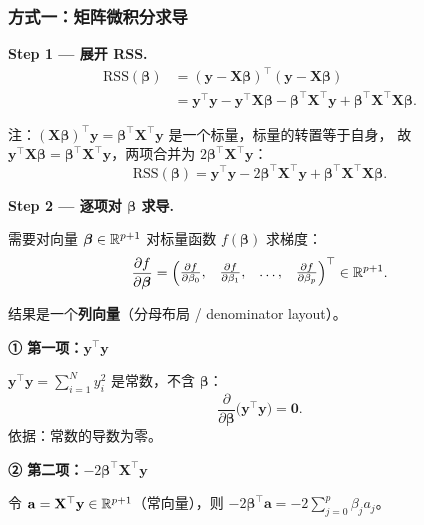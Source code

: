 \subsubsection{方式一：矩阵微积分求导}

\textbf{Step 1 --- 展开 RSS.}
\begin{align}
    \mathrm{RSS}(\bm{\beta})
    &= (\mathbf{y} - \mathbf{X}\bm{\beta})^\top (\mathbf{y} - \mathbf{X}\bm{\beta}) \nonumber\\
    &= \mathbf{y}^\top \mathbf{y} - \mathbf{y}^\top \mathbf{X}\bm{\beta}
       - \bm{\beta}^\top \mathbf{X}^\top \mathbf{y}
       + \bm{\beta}^\top \mathbf{X}^\top \mathbf{X} \bm{\beta}. \label{eq:rss_expanded}
\end{align}

注：$(\mathbf{X}\bm{\beta})^\top \mathbf{y} = \bm{\beta}^\top \mathbf{X}^\top \mathbf{y}$ 是一个标量，标量的转置等于自身，
故 $\mathbf{y}^\top \mathbf{X}\bm{\beta} = \bm{\beta}^\top \mathbf{X}^\top \mathbf{y}$，两项合并为 $2\bm{\beta}^\top \mathbf{X}^\top \mathbf{y}$：
\begin{equation}
    \mathrm{RSS}(\bm{\beta})
    = \mathbf{y}^\top \mathbf{y} - 2\bm{\beta}^\top \mathbf{X}^\top \mathbf{y}
      + \bm{\beta}^\top \mathbf{X}^\top \mathbf{X} \bm{\beta}. \label{eq:rss_simplified}
\end{equation}

\textbf{Step 2 --- 逐项对 $\bm{\beta}$ 求导.}

需要对向量 $\bm{\beta} \in \mathbb{R}^{p+1}$ 对标量函数 $f(\bm{\beta})$ 求梯度：
\[
    \frac{\partial f}{\partial \bm{\beta}} =
    \begin{pmatrix}
        \frac{\partial f}{\partial \beta_0}, &
        \frac{\partial f}{\partial \beta_1}, &
        \dots, &
        \frac{\partial f}{\partial \beta_p}
    \end{pmatrix}^\top \in \mathbb{R}^{p+1}.
\]

结果是一个\textbf{列向量}（分母布局 / denominator layout）。

\bigskip
\noindent\textbf{① 第一项：$\mathbf{y}^\top \mathbf{y}$}

$\mathbf{y}^\top \mathbf{y} = \sum_{i=1}^{N} y_i^2$ 是常数，不含 $\bm{\beta}$：
\[
    \boxed{\frac{\partial}{\partial \bm{\beta}}\big(\mathbf{y}^\top \mathbf{y}\big) = \mathbf{0}}.
\]
依据：常数的导数为零。

\medskip
\noindent\textbf{② 第二项：$-2\bm{\beta}^\top \mathbf{X}^\top \mathbf{y}$}

令 $\mathbf{a} = \mathbf{X}^\top \mathbf{y} \in \mathbb{R}^{p+1}$（常向量），则 $-2\bm{\beta}^\top \mathbf{a} = -2\sum_{j=0}^{p} \beta_j a_j$。

